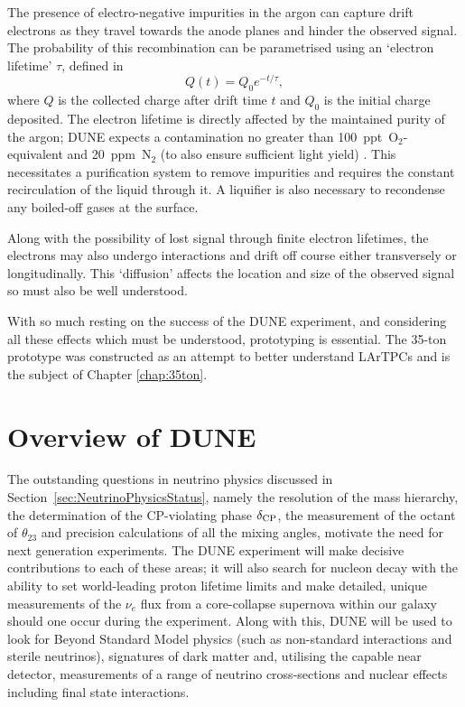 The presence of electro-negative impurities in the argon can capture drift electrons as they travel towards the anode planes and hinder the observed signal.  The probability of this recombination can be parametrised using an `electron lifetime' $\tau$, defined in
\begin{equation}\label{eq:ElectronLifetime}
  Q(t) = Q_0 e^{-t/\tau},
\end{equation}
where $Q$ is the collected charge after drift time $t$ and $Q_0$ is the initial charge deposited.  The electron lifetime is directly affected by the maintained purity of the argon; DUNE expects a contamination no greater than 100~ppt~O$_2$-equivalent and 20~ppm~N$_2$ (to also ensure sufficient light yield) \cite{DUNECDR4}.  This necessitates a purification system to remove impurities and requires the constant recirculation of the liquid through it.  A liquifier is also necessary to recondense any boiled-off gases at the surface.

Along with the possibility of lost signal through finite electron lifetimes, the electrons may also undergo interactions and drift off course either transversely or longitudinally.  This `diffusion' affects the location and size of the observed signal so must also be well understood.

With so much resting on the success of the DUNE experiment, and considering all these effects which must be understood, prototyping is essential.  The 35-ton prototype was constructed as an attempt to better understand LArTPCs and is the subject of Chapter \ref{chap:35ton}.

\section{Overview of DUNE}\label{sec:DUNEOverview}

The outstanding questions in neutrino physics discussed in Section~\ref{sec:NeutrinoPhysicsStatus}, namely the resolution of the mass hierarchy, the determination of the CP-violating phase $\delta_{\textnormal{CP}}$, the measurement of the octant of $\theta_{23}$ and precision calculations of all the mixing angles, motivate the need for next generation experiments.  The DUNE experiment will make decisive contributions to each of these areas; it will also search for nucleon decay with the ability to set world-leading proton lifetime limits and make detailed, unique measurements of the $\nu_e$ flux from a core-collapse supernova within our galaxy should one occur during the experiment.  Along with this, DUNE will be used to look for Beyond Standard Model physics (such as non-standard interactions and sterile neutrinos), signatures of dark matter and, utilising the capable near detector, measurements of a range of neutrino cross-sections and nuclear effects including final state interactions.

